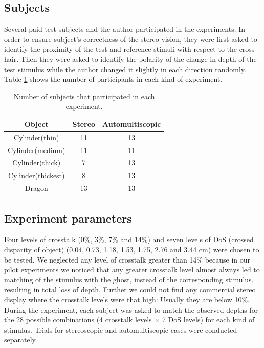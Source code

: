 \subsection{Subjects}
Several paid test subjects and the author participated in the experiments. In order to ensure subject's correctness of the stereo vision, they were first asked to identify the proximity of the test and reference stimuli with respect to the cross-hair. Then they were asked to identify the polarity of the change in depth of the test stimulus while the author changed it slightly in each direction randomly. Table \ref{tab:agg_subj} shows the number of participants in each kind of experiment.
\begin{table}[ht!]
  \begin{center}
    \caption{Number of subjects that participated in each experiment.}
    \label{tab:agg_subj}
    \begin{tabular}{ccc}
      \toprule
      Object & Stereo  & Automultiscopic\\
      \midrule
      Cylinder(thin) & 11 & 13  \\
      Cylinder(medium) & 11 & 11\\
      Cylinder(thick) & 7 & 13\\
      Cylinder(thickest) & 8 & 13 \\
      Dragon & 13 & 13\\
      \bottomrule
    \end{tabular}
  \end{center}
\end{table}

\subsection{Experiment parameters}
Four levels of crosstalk (0\%, 3\%, 7\% and 14\%) and seven levels of DoS (crossed disparity of object) (0.04, 0.73, 1.18, 1.53, 1.75, 2.76 and 3.44 cm) were chosen to be tested. We neglected any level of crosstalk greater than 14\% because in our pilot experiments we noticed that any greater crosstalk level almost always led to matching of the stimulus with the ghost, instead of the corresponding stimulus, resulting in total loss of depth. Further we could not find any commercial stereo display where the crosstalk levels were that high: Usually they are below 10\%. During the experiment, each subject was asked to match the observed depths for the 28 possible combinations (4 crosstalk levels $\times$ 7 DoS levels) for each kind of stimulus. Trials for stereoscopic and automultiscopic cases were conducted separately.
\\
